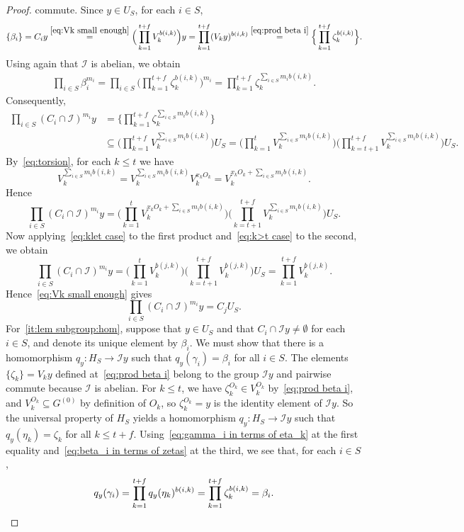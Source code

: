 \documentclass[a4paper, 12pt]{amsart}
\theoremstyle{plain}
\theoremstyle{definition}
\theoremstyle{remark}
\newcommand{\Ii}{\mathcal{I}}
\numberwithin{equation}{section}
\begin{document}
\begin{proof}
commute. Since $y\in U_S$, for each $i\in S$,
\begin{align}\label{eq:beta_i in terms of zetas}
    \{\beta_{i}\}
    =
    C_{i} y
    \overset{\eqref{eq:Vk small enough}}{=}
    \Big(\prod^{t+f}_{k=1} V_k^{b(i,k)}\Big) y
    =
    \prod^{t+f}_{k=1} (V_k y)^{b(i,k)}
    \overset{\eqref{eq:prod beta i}}{=}
    \Big\{ \prod^{t+f}_{k=1} \zeta_k^{b(i,k)}\Big\}.
\end{align}
Using again that $\Ii$ is abelian, we obtain
\begin{align}\label{eq:prod of betas in terms of zetas}
    \prod_{i \in  S } \beta_i^{m_i}
    =
    \prod_{i \in  S } \Big( \prod^{t+f}_{k=1} \zeta_k^{b(i,k)}\Big)^{m_i}
    =
    \prod^{t+f}_{k=1} \zeta_k^{\sum_{i\in S} m_i b(i,k)}
    .
\end{align}
Consequently,
\begin{align*}
\prod_{i \in  S } (C_i\cap\Ii)^{m_i}y
    &= \Big\{ \prod^{t+f}_{k=1} \zeta_k^{\sum_{i\in S} m_i b(i,k)} \Big\}\\
    &\subseteq \Big(\prod^{t+f}_{k = 1} V_k^{\sum_{i \in  S } m_i b(i,k)}\Big) U_S
    = \Big(\prod^t_{k=1} V_k^{\sum_{i \in  S } m_i b(i,k)}\Big) \Big(\prod^{t+f}_{k=t+1} V_k^{\sum_{i \in  S } m_i b(i,k)}\Big) U_S.
\end{align*}
By~\eqref{eq:torsion}, for each $k \le t$ we have
\[
V_k^{\sum_{i \in  S } m_i b(i,k)}
    = V_k^{\sum_{i \in  S } m_i b(i,k)} V_k^{x_k O_k}
    = V_k^{x_k O_k + \sum_{i \in  S } m_i b(i,k)}.
\]
Hence
\[
\prod_{i \in S } (C_i\cap\Ii)^{m_i}y
    = \Big(\prod^t_{k=1} V_k^{x_k O_k + \sum_{i \in  S } m_i b(i,k)}\Big) \Big(\prod^{t+f}_{k=t+1} V_k^{\sum_{i \in  S } m_i b(i,k)}\Big) U_S.
\]
Now applying~\eqref{eq:klet case} to the first product and~\eqref{eq:k>t
case} to the second, we obtain
\[
\prod_{i \in S } (C_i\cap\Ii)^{m_i}y
        = \Big(\prod^t_{k=1} V_k^{b(j,k)}\Big) \Big(\prod^{t+f}_{k=t+1} V_k^{b(j,k)}\Big) U_S
        = \prod^{t+f}_{k=1} V_k^{b(j,k)}.
\]
Hence~\eqref{eq:Vk small enough} gives
\[
\prod_{i \in  S } (C_i\cap\Ii)^{m_i}y
    = C_j U_S.
\]
For~\ref{it:lem subgroup:hom}, suppose that $y \in U_S$ and that $C_i \cap
\Ii y \not= \emptyset$ for each $i \in S$, and denote its unique element by
$\beta_i$. We must show that there is a homomorphism $q_y \colon H_S \to \Ii
y$ such that $q_y(\gamma_i) = \beta_i$ for all $i \in S$. The elements
$\{\zeta_k\} = V_k y$ defined at~\eqref{eq:prod beta i} belong to the group
$\Ii y$ and pairwise commute because $\Ii$ is abelian. For $k \le t$, we have
$\zeta_k^{O_k} \in V_k^{O_k}$ by~\eqref{eq:prod beta i}, and $V_k^{O_k}
\subseteq G^{(0)}$ by definition of $O_k$, so $\zeta_k^{O_k} = y$ is the
identity element of $\Ii y$. So the universal property of $H_S$ yields a
homomorphism $q_y \colon H_S \to \Ii y$ such that $q_y(\eta_k) = \zeta_k$ for
all $k \le t + f$. Using~\eqref{eq:gamma_i in terms of eta_k} at the
first equality and~\eqref{eq:beta_i in terms of zetas} at the third, we see
that, for each $i \in S$,
\[
q_y(\gamma_i)
    = \prod^{t+f}_{k=1} q_y(\eta_k)^{b(i,k)}
    = \prod^{t+f}_{k=1} \zeta_k^{b(i,k)}
    = \beta_{i}.\qedhere
\]
\end{proof}
\end{document}

